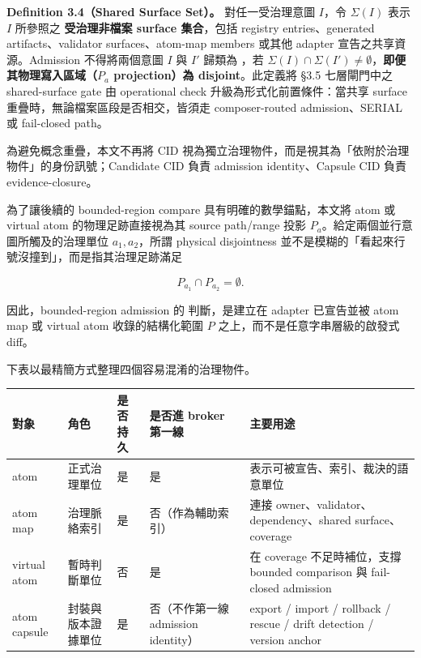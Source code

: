 \documentclass[a4paper,fontset=none]{ctexart}
\begin{document}
\textbf{Definition 3.4（Shared Surface Set）。} 對任一受治理意圖 $I$，令 $\Sigma(I)$ 表示 $I$ 所參照之 \textbf{受治理非檔案 surface 集合}，包括 registry entries、generated artifacts、validator surfaces、atom-map members 或其他 adapter 宣告之共享資源。Admission 不得將兩個意圖 $I$ 與 $I'$ 歸類為 \texttt{}，若 $\Sigma(I) \cap \Sigma(I') \neq \emptyset$，\textbf{即便其物理寫入區域（$P_a$ projection）為 disjoint}。此定義將 §3.5 七層閘門中之 shared-surface gate 由 operational check 升級為形式化前置條件：當共享 surface 重疊時，無論檔案區段是否相交，皆須走 composer-routed admission、SERIAL 或 fail-closed path。

為避免概念重疊，本文不再將 CID 視為獨立治理物件，而是視其為「依附於治理物件」的身份訊號；Candidate CID 負責 admission identity、Capsule CID 負責 evidence-closure。

為了讓後續的 bounded-region compare 具有明確的數學錨點，本文將 atom 或 virtual atom 的物理足跡直接視為其 source path/range 投影 $P_a$。給定兩個並行意圖所觸及的治理單位 $a_1, a_2$，所謂 physical disjointness 並不是模糊的「看起來行號沒撞到」，而是指其治理足跡滿足

$$P_{a_1} \cap P_{a_2} = \emptyset.$$

因此，bounded-region admission 的 \texttt{} 判斷，是建立在 adapter 已宣告並被 atom map 或 virtual atom 收錄的結構化範圍 $P$ 之上，而不是任意字串層級的啟發式 diff。

下表以最精簡方式整理四個容易混淆的治理物件。

\smallskip{}\par\smallskip

\begingroup
\footnotesize
{}
\begin{longtable}{L{0.18\textwidth}L{0.18\textwidth}L{0.18\textwidth}L{0.18\textwidth}L{0.18\textwidth}}
\toprule
對象 & 角色 & 是否持久 & 是否進 broker 第一線 & 主要用途 \\
\midrule
atom & 正式治理單位 & 是 & 是 & 表示可被宣告、索引、裁決的語意單位 \\
atom map & 治理脈絡索引 & 是 & 否（作為輔助索引） & 連接 owner、validator、dependency、shared surface、coverage \\
virtual atom & 暫時判斷單位 & 否 & 是 & 在 coverage 不足時補位，支撐 bounded comparison 與 fail-closed admission \\
atom capsule & 封裝與版本證據單位 & 是 & 否（不作第一線 admission identity） & export / import / rollback / rescue / drift detection / version anchor \\
\bottomrule
\end{longtable}
\endgroup
\end{document}
